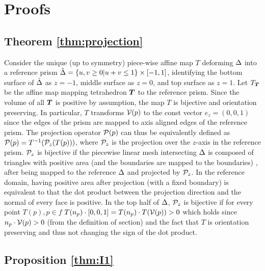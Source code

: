 \section{Proofs}
\subsection{Theorem \ref{thm:projection}}\label{app:projection}
Consider the unique (up to symmetry) piece-wise affine map $T$ deforming $\Prism$ into a reference prism $\hat\Prism = \{u,v \geq 0|u+v \leq 1\} \times [-1,1]$, identifying the bottom surface of $\hat\Prism$ as $z=-1$, middle surface as $z=0$, and top surface as $z=1$.
Let $T_{\Tet}$ be the affine map mapping tetrahedron $\Tet$ to the reference prism.
Since the volume of all $\Tet$ is positive by assumption, the map $T$ is bijective and orientation preserving. 
In particular, $T$ transforms $\V(p)$ to the const vector $e_z = (0,0,1)$ since the edges of the prism are mapped to axis aligned edges of the reference prism. The projection operator $\P(p)$ can thus be equivalently defined as $\P(p) = T^{-1}(\P_z(T(p)))$, where $\P_z$ is the projection over the $z$-axis in the reference prism. 
$\P_z$ is bijective if the piecewise linear mesh intersecting $\Prism$ is composed of triangles with positive area (and the boundaries are mapped to the boundaries) \cite{lipman2014bijective}, after being mapped to the reference $\Prism$ and projected by $\P_z$. In the reference domain, having positive area after projection (with a fixed boundary) is equivalent to that the dot product between the projection direction and the normal of every face is positive. In the top half of $\Prism$, $\P_z$ is bijective if for every point $T(p), p \in f$ $T(n_p)\cdot [0,0,1] = T(n_p) \cdot T(\V(p)) > 0$  which holds since $ n_p \cdot \V(p) > 0$ (from the definition of section) and the fact that $T$ is orientation preserving and thus not changing the sign of the dot product.

\subsection{Proposition \ref{thm:I1}}\label{app:I1}

